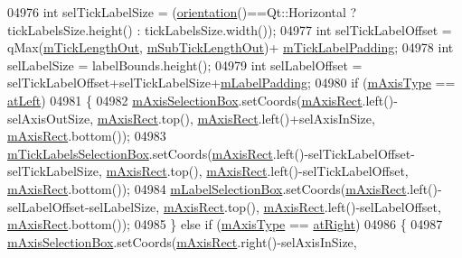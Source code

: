 \begin{DoxyCode}
04976   \textcolor{keywordtype}{int} selTickLabelSize = (\hyperlink{a00025_a57483f2f60145ddc9e63f3af53959265}{orientation}()==Qt::Horizontal ? tickLabelsSize.height() : 
      tickLabelsSize.width());
04977   \textcolor{keywordtype}{int} selTickLabelOffset = qMax(\hyperlink{a00025_a2951f26d8a504d330157e05063513809}{mTickLengthOut}, \hyperlink{a00025_ae0342609ad543c2667673d75b43d9dbb}{mSubTickLengthOut})+
      \hyperlink{a00025_ab3f2f5d923c83d952922149d0d1e2eb1}{mTickLabelPadding};
04978   \textcolor{keywordtype}{int} selLabelSize = labelBounds.height();
04979   \textcolor{keywordtype}{int} selLabelOffset = selTickLabelOffset+selTickLabelSize+\hyperlink{a00025_ae392a7c1a88a58765a7ed899642d248a}{mLabelPadding};
04980   \textcolor{keywordflow}{if} (\hyperlink{a00025_ae704bf9f2c2b026f08dd4ccad79c616e}{mAxisType} == \hyperlink{a00025_ae2bcc1728b382f10f064612b368bc18aaf84aa6cac6fb6099f54a2cbf7546b730}{atLeft})
04981   \{
04982     \hyperlink{a00025_a6185814615059cacf09fdb74a3e539d7}{mAxisSelectionBox}.setCoords(\hyperlink{a00025_ad63d51f30f835f3a568b6231362ed4a0}{mAxisRect}.left()-selAxisOutSize, 
      \hyperlink{a00025_ad63d51f30f835f3a568b6231362ed4a0}{mAxisRect}.top(), \hyperlink{a00025_ad63d51f30f835f3a568b6231362ed4a0}{mAxisRect}.left()+selAxisInSize, \hyperlink{a00025_ad63d51f30f835f3a568b6231362ed4a0}{mAxisRect}.bottom());
04983     \hyperlink{a00025_acca7a38191c1f4df06b9416d43172214}{mTickLabelsSelectionBox}.setCoords(\hyperlink{a00025_ad63d51f30f835f3a568b6231362ed4a0}{mAxisRect}.left()-selTickLabelOffset-
      selTickLabelSize, \hyperlink{a00025_ad63d51f30f835f3a568b6231362ed4a0}{mAxisRect}.top(), \hyperlink{a00025_ad63d51f30f835f3a568b6231362ed4a0}{mAxisRect}.left()-selTickLabelOffset, 
      \hyperlink{a00025_ad63d51f30f835f3a568b6231362ed4a0}{mAxisRect}.bottom());
04984     \hyperlink{a00025_a14fbf65daf2c38cbb0f2c4278a7929dd}{mLabelSelectionBox}.setCoords(\hyperlink{a00025_ad63d51f30f835f3a568b6231362ed4a0}{mAxisRect}.left()-selLabelOffset-selLabelSize, 
      \hyperlink{a00025_ad63d51f30f835f3a568b6231362ed4a0}{mAxisRect}.top(), \hyperlink{a00025_ad63d51f30f835f3a568b6231362ed4a0}{mAxisRect}.left()-selLabelOffset, \hyperlink{a00025_ad63d51f30f835f3a568b6231362ed4a0}{mAxisRect}.bottom());
04985   \} \textcolor{keywordflow}{else} \textcolor{keywordflow}{if} (\hyperlink{a00025_ae704bf9f2c2b026f08dd4ccad79c616e}{mAxisType} == \hyperlink{a00025_ae2bcc1728b382f10f064612b368bc18aadf5509f7d29199ef2f263b1dd224b345}{atRight})
04986   \{
04987     \hyperlink{a00025_a6185814615059cacf09fdb74a3e539d7}{mAxisSelectionBox}.setCoords(\hyperlink{a00025_ad63d51f30f835f3a568b6231362ed4a0}{mAxisRect}.right()-selAxisInSize, 

\end{DoxyCode}
